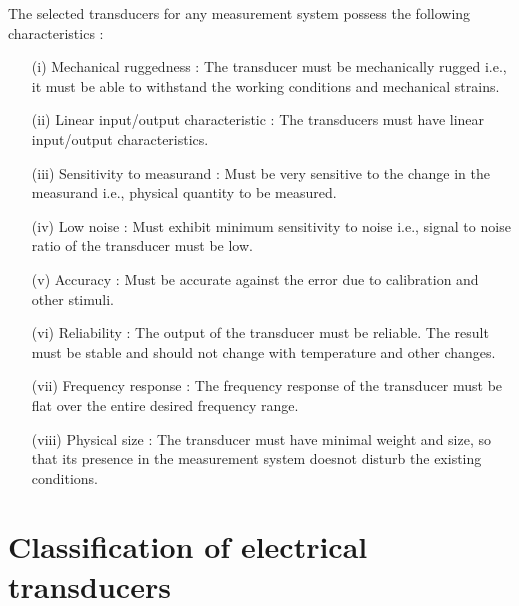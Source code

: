 The selected transducers for any measurement system possess the
following characteristics :
\begin{itemize}
\item[(i)] Mechanical ruggedness : The transducer must be mechanically
  rugged i.e., it must be able to withstand the working conditions and
  mechanical strains.

\item[(ii)] Linear input/output characteristic : The transducers must
  have linear input/output characteristics.

\item[(iii)] Sensitivity to measurand : Must be very sensitive to the
  change in the measurand i.e., physical quantity to be measured. 

\item[(iv)] Low noise : Must exhibit minimum sensitivity to noise i.e.,
  signal to noise ratio of the transducer must be low.

\item[(v)] Accuracy : Must be accurate against the error due to
  calibration and other stimuli.

\item[(vi)] Reliability : The output of the transducer must be
  reliable. The result must be stable and should not change with
  temperature and other changes.

\item[(vii)] Frequency response : The frequency response of the
  transducer must be flat over the entire desired frequency range.

\item[(viii)] Physical size : The transducer must have minimal weight
  and size, so that its presence in the measurement system doesnot
  disturb the existing conditions.
\end{itemize}

\section{Classification of electrical transducers}\label{sec9.4}

